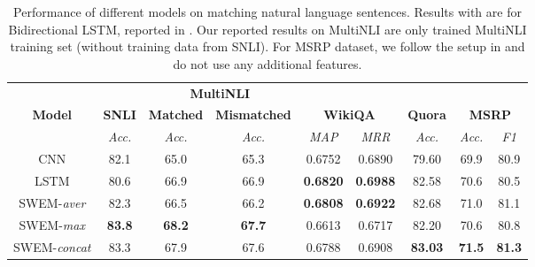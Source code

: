 \documentclass[11pt,a4paper]{article}
\begin{document}
\begin{table*}[t!] \vspace{0mm}
	\centering
\def\arraystretch{1.0}
	\begin{small}
		\begin{tabular}{c||c|cc|cc|c|cc}
\toprule[1.2pt]
			& &\multicolumn{2}{c|}{\textbf{MultiNLI}}  &  &  &   \\
			\textbf{Model} & \textbf{SNLI} & \textbf{Matched} & \textbf{Mismatched} & \multicolumn{2}{c|}{\textbf{WikiQA}} & \textbf{Quora} &  	\multicolumn{2}{c}{\textbf{MSRP}} \\
			\hline
			& \emph{Acc.} &\emph{Acc.} & \emph{Acc.}  & \emph{MAP} & \emph{MRR}   & \emph{Acc.} & \emph{Acc.} & \emph{F1} \\
			\hline
			CNN    & 82.1 & 65.0 & 65.3 & 0.6752 & 0.6890 &  79.60 & 69.9 & 80.9  \\
			LSTM   & 80.6 &  66.9 & 66.9 &  \bf{0.6820} & \bf{0.6988} &  82.58 & 70.6 & 80.5 \\
			\hline
			SWEM-\emph{aver}         & 82.3 & 66.5 & 66.2 &  \bf{0.6808} & \bf{0.6922} &  82.68 &   71.0 & 81.1  \\	
			SWEM-\emph{max}         & \bf{83.8}  & \textbf{68.2} & \textbf{67.7} & 0.6613 & 0.6717 & 82.20 & 70.6 & 80.8  \\	
			SWEM-\emph{concat}         & 83.3 & 67.9 & 67.6 & 0.6788 & 0.6908 &  \bf{83.03} & \bf{71.5} & \bf{81.3} \\	
\bottomrule[1.2pt]
		\end{tabular}
\caption{Performance of different models on matching natural language sentences. Results with  are for Bidirectional LSTM, reported in \citet{williams2017broad}. Our reported results on MultiNLI are only trained MultiNLI training set (without training data from SNLI). For MSRP dataset, we follow the setup in \citet{hu2014convolutional} and do not use any additional features.}
		\label{tab:matching}
	\end{small}
	\vspace{-3mm}
\end{table*}
\end{document}

